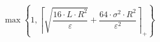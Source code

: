 \[\max\left\{ 1, \left\lceil \sqrt{\frac{16 \cdot L \cdot R^{2}}{\varepsilon}} + \frac{64 \cdot \sigma^{2} \cdot R^{2}}{\varepsilon^{2}} \right\rceil_{+} \right\}\]
